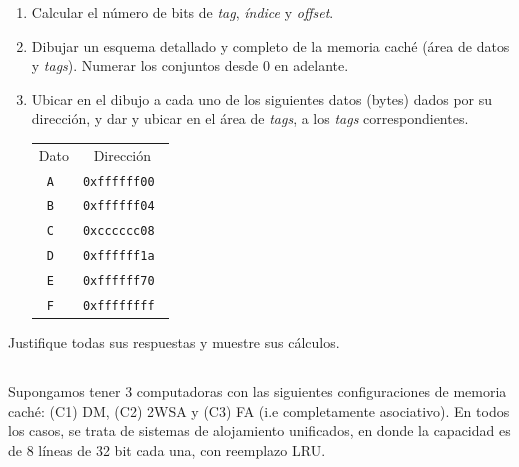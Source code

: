 \begin{enumerate}
 \item Calcular el número de bits de \textit{tag}, \textit{índice} y \textit{offset}.
 \item Dibujar un esquema detallado y completo de la memoria caché (área de datos y \textit{tags}). Numerar los conjuntos desde 0 en adelante.
 \item Ubicar en el dibujo a cada uno de los siguientes datos (bytes) dados por su dirección, y dar y ubicar en el área de \textit{tags}, a los \textit{tags} correspondientes.

\begin{center}
\begin{tabular}{cc}
Dato        &   Dirección       \\
\tt A	    &   \tt 0xffffff00  \\
\tt B	    &   \tt 0xffffff04  \\
\tt C	    &   \tt 0xcccccc08  \\
\tt D	    &   \tt 0xffffff1a  \\
\tt E	    &   \tt 0xffffff70  \\
\tt F	    &   \tt 0xffffffff  \\
\end{tabular}
\end{center}
\end{enumerate}

Justifique todas sus respuestas y muestre sus cálculos.


\subsection{}
Supongamos tener 3 computadoras con las siguientes configuraciones de memoria caché: (C1) DM, (C2) 2WSA y (C3) FA (i.e completamente asociativo). En todos los casos, se trata de sistemas de alojamiento unificados, en donde la capacidad es de 8 líneas de 32 bit cada una, con reemplazo LRU. 

